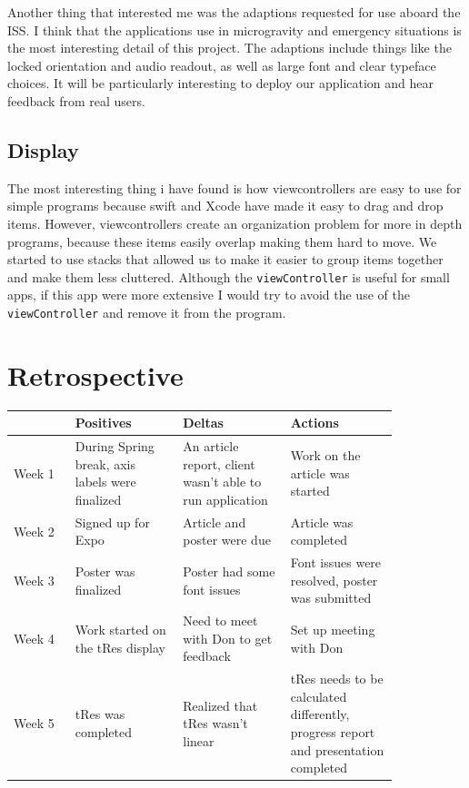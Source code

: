 \documentclass[onecolumn, draftclsnofoot,10pt, compsoc]{IEEEtran}
\begin{document}
Another thing that interested me was the adaptions requested for use aboard the ISS.
I think that the applications use in microgravity and emergency situations is the most interesting detail of this project.
The adaptions include things like the locked orientation and audio readout, as well as large font and clear typeface choices.
It will be particularly interesting to deploy our application and hear feedback from real users.


\subsection{Display}

The most interesting thing i have found is how viewcontrollers are easy to use for simple programs because swift and Xcode have made it easy to drag and drop items.
However, viewcontrollers create an organization problem for more in depth programs, because these items easily overlap making them hard to move.
We started to use stacks that allowed us to make it easier to group items together and make them less cluttered.
Although the \texttt{viewController} is useful for small apps, if this app were more extensive I would try to avoid the use of the \texttt{viewController} and remove it from the program.


\section{Retrospective}
\begin{center}
	\begin{longtable}{| l | p{0.28\linewidth} | p{0.28\linewidth} | p{0.28\linewidth} |}
		\hline
		& Positives & Deltas & Actions \\ \hline
    Week 1 & During Spring break, axis labels were finalized & An article report, client wasn't able to run application & Work on the article was started \\ \hline
	Week 2 & Signed up for Expo & Article and poster were due & Article was completed \\ \hline
	Week 3 & Poster was finalized & Poster had some font issues & Font issues were resolved, poster was submitted \\ \hline
	Week 4 & Work started on the tRes display & Need to meet with Don to get feedback & Set up meeting with Don \\ \hline
  Week 5 & tRes was completed & Realized that tRes wasn't linear & tRes needs to be calculated differently, progress report and presentation completed \\ \hline
\end{longtable}
\end{center}

\newpage


\end{document}
